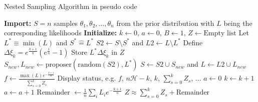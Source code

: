 \begin{algorithm}
	\caption{Nested Sampling Algorithm in pseudo code}
	\begin{algorithmic}[1]
		\State \textbf{Import:} $S = n$ samples $\theta_1, \theta_2, \dots, \theta_n$ from the prior distribution with $L$ being the corresponding likelihoods
		\State \textbf{Initialize:} $k \gets 0$, $a \gets 0$, $B \gets 1$, $Z \gets \text{Empty list}$
		\State Let $L^* \equiv \min(L)$ and $S^* \widehat{=} L^*$
		\State $S2 \gets S \setminus S^*$ and $L2 \gets L \setminus L^*$
		\State Define $\Delta \xi_k = e^{\frac{k+1}{n}} (e^\frac{1}{n} - 1)$
		\State Store $L^* \Delta \xi_k$ in $Z$
		\State $S_{new}, L_{new} \gets \text{proposer}(\text{random}(S2), L^*)$
		\State $S \gets S2 \cup S_{new}$ and $L \gets L2 \cup L_{new}$
		\State $f \gets \frac{\max(L) e^{-\frac{k+1}{n}}}{\sum_{s=0}^k Z_s}$
		\State Display status, e.g. $f$, $n\mathcal{H} - k$, $k$, $\sum_{s=0}^k Z_s$, ...
		\State $a \gets 0$
		\EndIf
		\State $k \gets k + 1$
		\State $a \gets a + 1$
		\EndWhile
		\State Remainder $\gets \frac{1}{n} \sum_i L_i e^{-\frac{k+1}{n}}$
		\State $Z \approx \sum_{s=0}^k Z_s + \text{Remainder}$
	\end{algorithmic}
	\label{alg:NS}
\end{algorithm}

